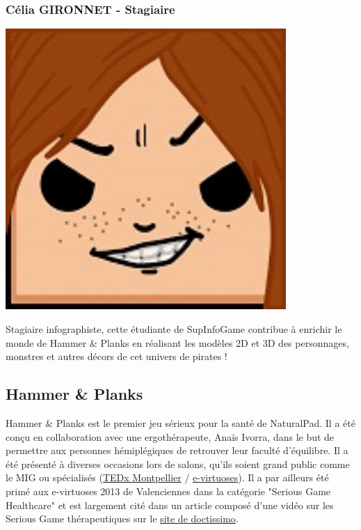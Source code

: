 		\subsubsection*{Célia GIRONNET - Stagiaire}
\begin{minipage}[t!]{0.2\linewidth}
\centering
\includegraphics[width=0.8\textwidth]{images/tetocarre/celia}
\end{minipage}
\begin{minipage}[t!]{0.79\linewidth}
Stagiaire infographiste, cette étudiante de SupInfoGame contribue à enrichir le monde de Hammer \& Planks en réalisant les modèles 2D et 3D des personnages, monstres et autres décors de cet univers de pirates !
\end{minipage}

	\subsection{Hammer \& Planks}
Hammer \& Planks est le premier jeu sérieux pour la santé de NaturalPad. Il a été conçu en collaboration avec une ergothérapeute, Anaïs Ivorra, dans le but de permettre aux personnes hémiplégiques de retrouver leur faculté d’équilibre. Il a été présenté à diverses occasions lors de salons, qu’ils soient grand public comme le MIG ou spécialisés (\href{http://www.ted.com/tedx/events/5188}{TEDx Montpellier} / \href{http://www.e-virtuoses.net/}{e-virtuoses}). Il a par ailleurs été primé aux e-virtuoses 2013 de Valenciennes dans la catégorie "Serious Game Healthcare" et est largement cité dans un article composé d'une vidéo sur les Serious Game thérapeutiques sur le \href{http://videos.doctissimo.fr/sante/recherche/serious-game-therapeutique.html}{site de doctissimo}.
		
